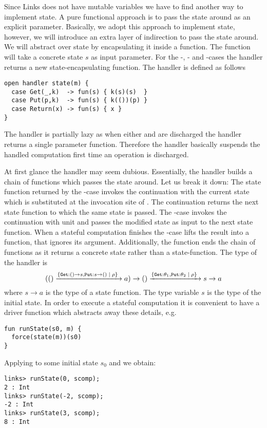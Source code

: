 \begin{example}\label{ex:state}
Since Links does not have mutable variables we have to find another way to implement state. A pure functional approach is to pass the state around as an explicit parameter.
Basically, we adopt this approach to implement state, however, we will introduce an extra layer of indirection
to pass the state around. We will abstract over state by encapsulating it inside a function. The function will take a concrete state $s$ as input parameter. For the -, - and -cases the handler returns a new state-encapsulating function. The  handler is defined as follows
\begin{lstlisting}[style=links]
open handler state(m) {
  case Get(_,k)  -> fun(s) { k(s)(s)  }
  case Put(p,k)  -> fun(s) { k(())(p) }
  case Return(x) -> fun(s) { x }
}
\end{lstlisting}
The  handler is partially lazy as when either  and  are discharged the handler returns a single parameter function. Therefore the handler basically suspends the handled computation first time an operation is discharged.

At first glance the  handler may seem dubious. Essentially, the handler builds a chain of functions which passes the state around. Let us break it down: The state function returned by the -case invokes the continuation with the current state which is substituted at the invocation site of . The continuation returns the next state function to which the same state is passed.
The -case invokes the continuation with unit and passes the modified state  as input to the next state function.
When a stateful computation finishes the -case lifts the result into a function, that ignores its argument. Additionally, the function ends the chain of functions as it returns a concrete state rather than a state-function. The type of the  handler is \[ 
(() \xrightarrow{ \{ \texttt{Get}: () \to s, \texttt{Put}: s \to () \; | \; \rho\}\;} a) \to () \xrightarrow{ \{\texttt{Get}:\theta_1, \texttt{Put}:\theta_2 \; | \; \rho\}\;} s \to a 
\]
where $s \to a$ is the type of a state function. The type variable $s$ is the type of the initial state. In order to execute a stateful computation it is convenient to have a driver function  which abstracts away these details, e.g.
\begin{lstlisting}[style=links]
fun runState(s0, m) {
  force(state(m))(s0)
}
\end{lstlisting}
Applying  to some initial state $s_0$ and  we obtain:
\begin{lstlisting}[style=links]
links> runState(0, scomp);
2 : Int
links> runState(-2, scomp);
-2 : Int
links> runState(3, scomp);
8 : Int
\end{lstlisting}
\end{example}
